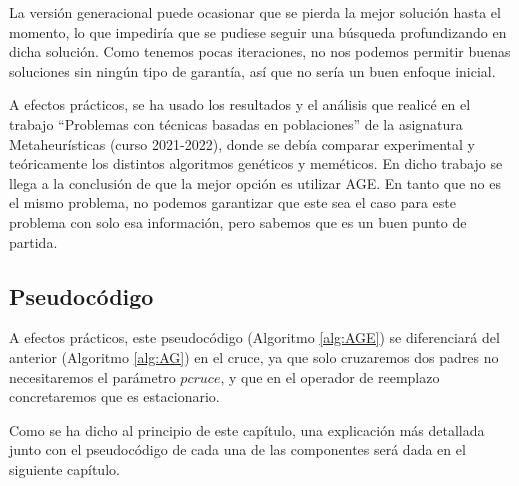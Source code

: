 La versión generacional puede ocasionar que se pierda la mejor solución hasta el momento, lo que impediría que se pudiese seguir una búsqueda profundizando en dicha solución. 
Como tenemos pocas iteraciones, no nos podemos permitir buenas soluciones sin ningún tipo de garantía, así que no sería un buen enfoque inicial. 


A efectos prácticos, se ha usado los resultados y el análisis que realicé en el trabajo ``Problemas con técnicas basadas en poblaciones'' de la asignatura Metaheurísticas (curso 2021-2022), donde se debía comparar experimental y teóricamente los distintos algoritmos genéticos y meméticos. 
En dicho trabajo se llega a la conclusión de que la mejor opción es utilizar AGE. 
En tanto que no es el mismo problema, no podemos garantizar que este sea el caso para este problema con solo esa información, pero sabemos que es un buen punto de partida.

\subsection{Pseudocódigo}

A efectos prácticos, este pseudocódigo (Algoritmo \ref{alg:AGE}) se diferenciará del anterior (Algoritmo \ref{alg:AG}) en el cruce, ya que solo cruzaremos dos padres no necesitaremos el parámetro $pcruce$, y que en el operador de reemplazo concretaremos que es estacionario. 

Como se ha dicho al principio de este capítulo, una explicación más detallada junto con el pseudocódigo de cada una de las componentes será dada en el siguiente capítulo.

